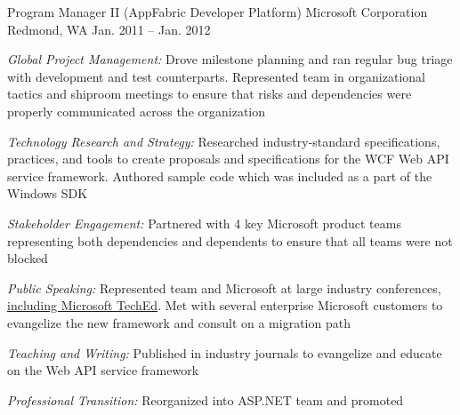 \begin{cventries}

\cventry 
{Program Manager II (AppFabric Developer Platform)}
{Microsoft Corporation}
{Redmond, WA}
{Jan. 2011 – Jan. 2012}
{ %
\begin{cvitems}
\item {\emph{Global Project Management:} Drove milestone planning and ran regular bug triage with development and test counterparts. Represented team in organizational tactics and shiproom meetings to ensure that risks and dependencies were properly communicated across the organization }
\item {\emph{Technology Research and Strategy:} Researched industry-standard specifications, practices, and tools to create proposals and specifications for the WCF Web API service framework. Authored sample code which was included as a part of the Windows SDK }
\item {\emph{Stakeholder Engagement:} Partnered with 4 key Microsoft product teams representing both dependencies and dependents to ensure that all teams were not blocked }
\item {\emph{Public Speaking:} Represented team and Microsoft at large industry conferences, \href{https://channel9.msdn.com/Events/TechEd/NorthAmerica/2011/MID307}{including Microsoft TechEd}. Met with several enterprise Microsoft customers to evangelize the new framework and consult on a migration path }
\item {\emph{Teaching and Writing:} Published in industry journals to evangelize and educate on the Web API service framework }
\item {\emph{Professional Transition:} Reorganized into ASP.NET team and promoted }
\end{cvitems}
}



\end{cventries}
